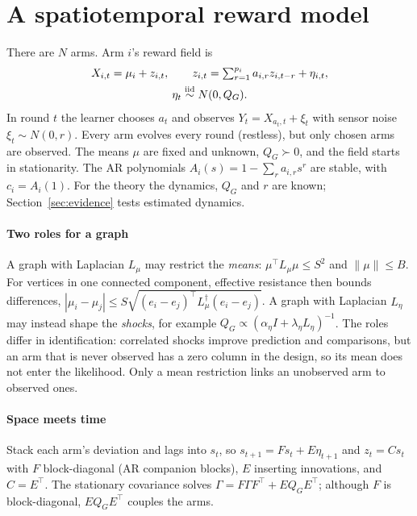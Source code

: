\documentclass[conference]{IEEEtran}
\begin{document}
\section{A spatiotemporal reward model}\label{sec:model}

There are $N$ arms. Arm $i$'s reward field is
\begin{equation}\label{eq:model}
\begin{gathered}
X_{i,t}=\mu_i+z_{i,t},\qquad z_{i,t}=\textstyle\sum_{r=1}^{p_i}a_{i,r}z_{i,t-r}+\eta_{i,t},\\
\eta_t\stackrel{\rm iid}{\sim}N(0,Q_G).
\end{gathered}
\end{equation}
In round $t$ the learner chooses $a_t$ and observes $Y_t=X_{a_t,t}+\xi_t$ with sensor noise $\xi_t\sim N(0,r)$. Every arm evolves every round (restless), but only chosen arms are observed. The means $\mu$ are fixed and unknown, $Q_G\succ0$, and the field starts in stationarity. The AR polynomials $A_i(s)=1-\sum_ra_{i,r}s^r$ are stable, with $c_i=A_i(1)$. For the theory the dynamics, $Q_G$ and $r$ are known; Section~\ref{sec:evidence} tests estimated dynamics.

\paragraph*{Two roles for a graph} A graph with Laplacian $L_\mu$ may restrict the \emph{means}: $\mu^\top L_\mu\mu\le S^2$ and $\|\mu\|\le B$. For vertices in one connected component, effective resistance then bounds differences, $|\mu_i-\mu_j|\le S\sqrt{(e_i-e_j)^\top L_\mu^\dagger(e_i-e_j)}$. A graph with Laplacian $L_\eta$ may instead shape the \emph{shocks}, for example $Q_G\propto(\alpha_\eta I+\lambda_\eta L_\eta)^{-1}$. The roles differ in identification: correlated shocks improve prediction and comparisons, but an arm that is never observed has a zero column in the design, so its mean does not enter the likelihood. Only a mean restriction links an unobserved arm to observed ones.

\paragraph*{Space meets time} Stack each arm's deviation and lags into $s_t$, so $s_{t+1}=Fs_t+E\eta_{t+1}$ and $z_t=Cs_t$ with $F$ block-diagonal (AR companion blocks), $E$ inserting innovations, and $C=E^\top$. The stationary covariance solves $\Gamma=F\Gamma F^\top+EQ_GE^\top$; although $F$ is block-diagonal, $EQ_GE^\top$ couples the arms.
\end{document}
